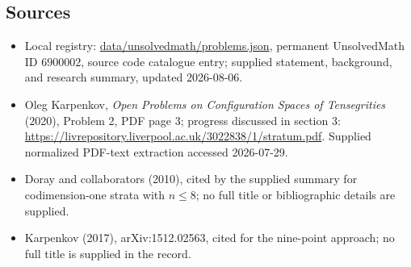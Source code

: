\documentclass[11pt]{article}
\begin{document}
\subsection{Sources}
\begin{itemize}
\item Local registry: \url{data/unsolvedmath/problems.json}, permanent UnsolvedMath ID \(6900002\), source code catalogue entry; supplied statement, background, and research summary, updated 2026-08-06.
\item Oleg Karpenkov, \emph{Open Problems on Configuration Spaces of Tensegrities} (2020), Problem 2, PDF page 3; progress discussed in section 3: \url{https://livrepository.liverpool.ac.uk/3022838/1/stratum.pdf}. Supplied normalized PDF-text extraction accessed 2026-07-29.
\item Doray and collaborators (2010), cited by the supplied summary for codimension-one strata with \(n\le8\); no full title or bibliographic details are supplied.
\item Karpenkov (2017), arXiv:1512.02563, cited for the nine-point approach; no full title is supplied in the record.
\end{itemize}
\end{document}
